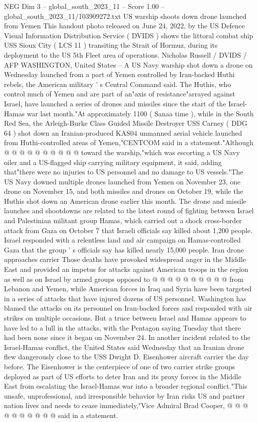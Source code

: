 \begin{textsample}{NEG Dim 3 – global\_south\_2023\_11 – Score 1.00 – global\_south\_2023\_11/103909272.txt}  \label{ex:f3_neg_084}
US warship shoots down drone launched from Yemen This handout photo released on June 24, 2022, by the US Defence Visual Information Distribution Service ( DVIDS ) shows the littoral combat ship USS Sioux City ( LCS 11 ) transiting the Strait of Hormuz, during its deployment to the US 5th Fleet area of operations.
Nicholas Russell / DVIDS / AFP WASHINGTON, United States -- A US Navy warship shot down a drone on Wednesday launched from a part of Yemen controlled by Iran-backed Huthi rebels, the American military ' s Central Command said.
The Huthis, who control much of Yemen and are part of an"axis of resistance"arrayed against Israel, have launched a series of drones and missiles since the start of the Israel-Hamas war last month."At approximately 1100 ( Sanaa time ), while in the South Red Sea, the Arleigh-Burke Class Guided Missile Destroyer USS Carney ( DDG 64 ) shot down an Iranian-produced KAS04 unmanned aerial vehicle launched from Huthi-controlled areas of Yemen,"CENTCOM said in a statement."Although @ @ @ @ @ @ @ @ @ @ toward the warship,"which was escorting a US Navy oiler and a US-flagged ship carrying military equipment, it said, adding that"there were no injuries to US personnel and no damage to US vessels."The US Navy downed multiple drones launched from Yemen on November 23, one drone on November 15, and both missiles and drones on October 19, while the Huthis shot down an American drone earlier this month.
The drone and missile launches and shootdowns are related to the latest round of fighting between Israel and Palestinian militant group Hamas, which carried out a shock cross-border attack from Gaza on October 7 that Israeli officials say killed about 1,200 people.
Israel responded with a relentless land and air campaign on Hamas-controlled Gaza that the group ' s officials say has killed nearly 15,000 people.
Iran drone approaches carrier Those deaths have provoked widespread anger in the Middle East and provided an impetus for attacks against American troops in the region as well as on Israel by armed groups opposed to @ @ @ @ @ @ @ @ @ @ from Lebanon and Yemen, while American forces in Iraq and Syria have been targeted in a series of attacks that have injured dozens of US personnel.
Washington has blamed the attacks on its personnel on Iran-backed forces and responded with air strikes on multiple occasions.
But a truce between Israel and Hamas appears to have led to a lull in the attacks, with the Pentagon saying Tuesday that there had been none since it began on November 24.
In another incident related to the Israel-Hamas conflict, the United States said Wednesday that an Iranian drone flew dangerously close to the USS Dwight D.
Eisenhower aircraft carrier the day before.
The Eisenhower is the centerpiece of one of two carrier strike groups deployed as part of US efforts to deter Iran and its proxy forces in the Middle East from escalating the Israel-Hamas war into a broader regional conflict."This unsafe, unprofessional, and irresponsible behavior by Iran risks US and partner nation lives and needs to cease immediately,"Vice Admiral Brad Cooper, @ @ @ @ @ @ @ @ @ @ said in a statement.

\end{textsample}

